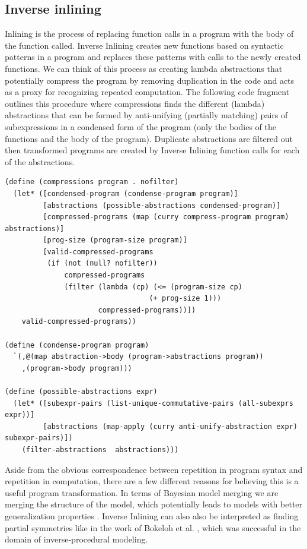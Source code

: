 \documentclass[a4paper,10pt]{article}
\begin{document}
\subsection{Inverse inlining}
Inlining is the process of replacing function calls in a program with the body of the function called.  Inverse Inlining creates new functions based on syntactic patterns in a program and replaces these patterns with calls to the newly created functions.  We can think of this process as creating lambda abstractions that potentially compress the program by removing duplication in the code and acts as a proxy for recognizing repeated computation.  The following code fragment outlines this procedure where compressions finds the different (lambda) abstractions that can be formed by anti-unifying (partially matching) pairs of subexpressions in a condensed form of the program (only the bodies of the functions and the body of the program).  Duplicate abstractions are filtered out then transformed programs are created by Inverse Inlining function calls for each of the abstractions.  

\begin{lstlisting}[frame=trBL]
(define (compressions program . nofilter)
  (let* ([condensed-program (condense-program program)]
         [abstractions (possible-abstractions condensed-program)]
         [compressed-programs (map (curry compress-program program) abstractions)]
         [prog-size (program-size program)]
         [valid-compressed-programs
          (if (not (null? nofilter))
              compressed-programs
              (filter (lambda (cp) (<= (program-size cp)
                                  (+ prog-size 1)))
                      compressed-programs))])
    valid-compressed-programs))

(define (condense-program program)
  `(,@(map abstraction->body (program->abstractions program))
    ,(program->body program)))

(define (possible-abstractions expr)
  (let* ([subexpr-pairs (list-unique-commutative-pairs (all-subexprs expr))]
         [abstractions (map-apply (curry anti-unify-abstraction expr) subexpr-pairs)])
    (filter-abstractions  abstractions)))
\end{lstlisting}

Aside from the obvious correspondence between repetition in program syntax and repetition in computation, there are a few different reasons for believing this is a useful program transformation.  In terms of Bayesian model merging we are merging the structure of the model, which potentially leads to models with better generalization properties \cite{Stolcke:1994:IPG:645515.658235}.  Inverse Inlining can also also be interpreted as finding partial symmetries like in the work of Bokeloh et al. \cite{DBLP:journals/tog/BokelohWS10}, which was successful in the domain of inverse-procedural modeling.
\end{document}
